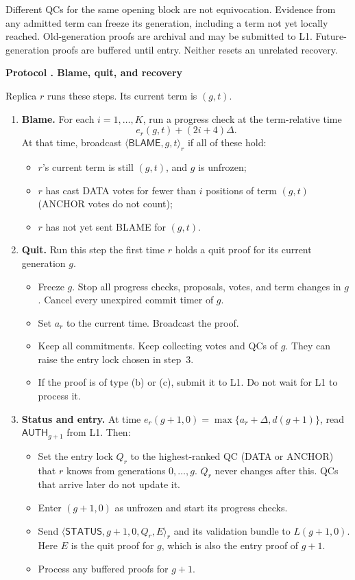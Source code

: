 \documentclass[11pt,a4paper]{article}
\newcommand{\RR}[1]{{\color{rrRed}#1}}
\newcommand{\tagg}[1]{\ensuremath{\mathsf{#1}}}
\newcounter{protocol}
\newenvironment{protocol}[2]{\refstepcounter{protocol}\label{#1}
\begin{mdframed}[nobreak=true,linewidth=.6pt,skipabove=8pt,skipbelow=8pt,
innertopmargin=7pt,innerbottommargin=7pt]\small
\textbf{Protocol \theprotocol. #2}\par\smallskip}{\end{mdframed}}
\begin{document}
Different QCs for the same opening block are not equivocation. Evidence
from any admitted term can freeze its generation, including a term not yet
locally reached. Old-generation proofs are archival and may be submitted to
L1. Future-generation proofs are buffered until entry. Neither resets an
unrelated recovery.

\begin{protocol}{alg:recovery}{Blame, quit, and recovery}
Replica $r$ runs these steps. Its current term is $(g,t)$.
\begin{enumerate}[label=\textbf{\arabic*)},itemsep=5pt]
\item \textbf{Blame.} For each $i=1,\ldots,K$, run a progress check at
\RR{the term-relative} time
\[
 e_r(g,t)+(2i+4)\Delta.
\]
At that time, broadcast $\langle\tagg{BLAME},g,t\rangle_r$ if all of these
hold:
 \begin{itemize}
 \item $r$'s current term is still $(g,t)$, and $g$ is unfrozen;
 \item $r$ has cast DATA votes for fewer than $i$ positions of term
       $(g,t)$ \RR{(ANCHOR votes do not count)};
 \item $r$ has not yet sent BLAME for $(g,t)$.
 \end{itemize}

\item \textbf{Quit.} Run this step the first time $r$ holds a quit proof
for its current generation $g$.
 \begin{itemize}
 \item \RR{Freeze $g$. Stop all progress checks, proposals, votes, and
       term changes in $g$. Cancel every unexpired commit timer of $g$.}
 \item Set $a_r$ to the current time. Broadcast the proof.
 \item Keep all commitments. Keep collecting votes and QCs of $g$.
       They can raise the entry lock chosen in step~3.
 \item \RR{If the proof is of type (b) or (c), submit it to L1. Do
       not wait for L1 to process it.}
 \end{itemize}

\item \textbf{Status and entry.} \RR{At time
$e_r(g+1,0)=\max\{a_r+\Delta,d(g+1)\}$, read $\tagg{AUTH}_{g+1}$ from L1.}
Then:
 \begin{itemize}
 \item Set the entry lock $Q_r$ to the highest-ranked QC
       (DATA or ANCHOR) that $r$ knows from generations
       $0,\ldots,g$.
       $Q_r$ never changes after this. QCs that arrive later do not update
       it.
 \item Enter $(g+1,0)$ \RR{as unfrozen and start its progress checks}.
 \item Send $\langle\tagg{STATUS},g+1,0,Q_r,E\rangle_r$ and its validation
       bundle to \RR{$L(g+1,0)$}. Here $E$ is the quit proof for $g$,
       which is also the entry proof of $g+1$.
 \item \RR{Process any buffered proofs for $g+1$.}
 \end{itemize}


\end{enumerate}
\end{protocol}
\end{document}
